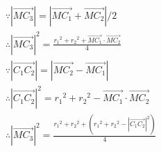 \begin{align*}
&\because \left| \overrightarrow{MC_3} \right|=\left| \overrightarrow{MC_1}+\overrightarrow{MC_2} \right|/2 \\
&\therefore \left| \overrightarrow{MC_3} \right|^2=\frac{{r_1}^2+{r_2}^2+\overrightarrow{MC_1}\cdot \overrightarrow{MC_2}}{4} \\
&\because \left| \overrightarrow{C_1C_2} \right|=\left| \overrightarrow{MC_2}-\overrightarrow{MC_1} \right| \\
&\therefore \left| \overrightarrow{C_1C_2} \right|^2={r_1}^2+{r_2}^2-\overrightarrow{MC_1}\cdot \overrightarrow{MC_2} \\
&\therefore \left| \overrightarrow{MC_3} \right|^2=\frac{{r_1}^2+{r_2}^2+\left( {r_1}^2+{r_2}^2-\left| \overrightarrow{C_1C_2} \right|^2 \right)}{4}
\end{align*}




